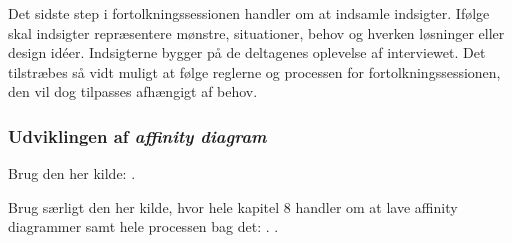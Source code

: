 Det sidste step i fortolkningssessionen handler om at indsamle indsigter. Ifølge \textcite[s. 119]{Book:CIInterpretationSession} skal indsigter repræsentere mønstre, situationer, behov og hverken løsninger eller design idéer. Indsigterne bygger på de deltagenes oplevelse af interviewet. \blankline
%
Det tilstræbes så vidt muligt at følge reglerne og processen for fortolkningssessionen, den vil dog tilpasses afhængigt af behov. 

\subsubsection{Udviklingen af \textit{affinity diagram}}
\label{ParametreUdviklingAfAffinity}
% 
 



    






  


Brug den her kilde: \textcite[ss. 24-28]{PDF:ConsolidationIdeationAffinity}. 

Brug særligt den her kilde, hvor hele kapitel 8 handler om at lave affinity diagrammer samt hele processen bag det: \textcite[ss. 159-179]{Book:BuildingAnAffinity}. .
